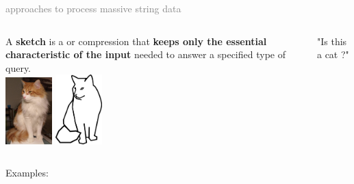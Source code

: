 \begin{frame}{\textcolor{gray}{ approaches to process massive string data}}
    \pause
    \begin{columns}
        A \textbf{sketch} is a  or  compression that \textbf{keeps only the essential characteristic of the input} needed to answer a specified type of query.\\
        \includegraphics[width=1.8cm]{pictures/photo_betisou.jpg}
        \hspace{0.5cm}
        \includegraphics[width=1.8cm]{pictures/betisou.png}\\
        \begin{center}
            "Is this a cat ?"
        \end{center}
    \end{columns}
    \pause

    {\Large Examples:}
    \medskip
    \begin{columns}
        {}
        {}
    \end{columns}
    
\end{frame}


